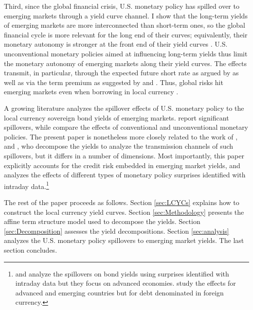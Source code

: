 {Third, since the global financial crisis, U.S. monetary policy has spilled over to emerging markets through a yield curve channel. %
I show that the long-term yields of emerging markets are more interconnected than short-term ones, %
so the global financial cycle is more relevant for the long end of their curves; equivalently, their monetary autonomy %
is stronger at the front end of their yield curves \citep{Obstfeld:2015}. U.S. unconventional monetary policies aimed at influencing long-term yields thus limit the monetary autonomy of emerging markets along their yield curves. The effects transmit, in particular, through the expected future short rate as argued by \cite{Kalemli-Ozcan:2019} as well as via the term premium as suggested by \cite{Turner:2014} and \cite{KolasaWesolowski:2020}. Thus, global risks hit emerging markets even when borrowing in local currency \citep{CarstensShin:2019}.

A growing literature analyzes the spillover effects of U.S. monetary policy to the local currency sovereign bond yields of emerging markets. \cite{HausmanWongswan:2011} report significant spillovers, %
while \cite{BowmanLondonoSapriza:2015} compare the effects of 
conventional and unconventional monetary policies. The present paper is nonetheless more closely related to the work of \cite{CurcuruKaminLiRodriguez:2018}, \cite{ACDM:2019} and \cite{Albaglietal:2019}, who decompose the yields to analyze the transmission channels of such spillovers, but it differs in a number of dimensions. Most importantly, this paper explicitly accounts for the credit risk embedded in emerging market yields, and analyzes the effects of different types of monetary policy surprises identified with intraday data.\footnote{\cite{RogersScottiWright:2014} and \cite{RogersScottiWright:2018} analyze the spillovers on bond yields using surprises identified with intraday data but they focus on advanced economies. \cite{GilchristYueZakrajsek:2019} study the effects for advanced and emerging countries but for debt denominated in foreign currency.}

The rest of the paper proceeds as follows. 
Section \ref{sec:LCYCs} explains how to construct the local currency yield curves. Section \ref{sec:Methodology} presents the affine term structure model used to decompose the yields.
Section \ref{sec:Decomposition} assesses the yield decompositions.
Section \ref{sec:analysis} analyzes the U.S. monetary policy spillovers to emerging market yields.
The last section concludes.


}
